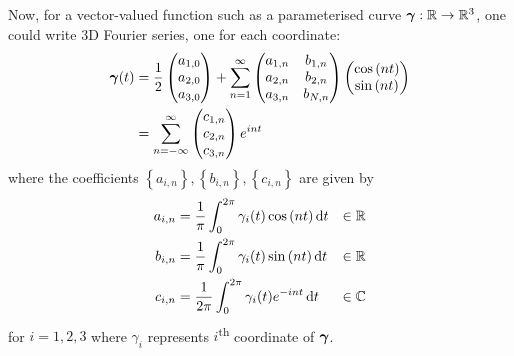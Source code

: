 \documentclass[../dissertation.tex]{subfiles}
\begin{document}
Now, for a vector-valued function such as a parameterised curve $\boldsymbol{\gamma}:\mathbb{R} \rightarrow \mathbb{R}^3$, one could write 3D Fourier series,
one for each coordinate:
\begin{align}
    \mathbf{\boldsymbol{\gamma}} (t) &= \frac{1}{2}
    \begin{pmatrix}
        a_{1,0} \\
        a_{2,0} \\
        a_{3,0}
    \end{pmatrix}
    + \sum_{n=1}^\infty
    \begin{pmatrix}
        a_{1,n} & b_{1,n} \\
        a_{2,n} & b_{2,n} \\
        a_{3,n} & b_{N,n}
    \end{pmatrix}
    \begin{pmatrix}
        \cos {\left( nt \right)} \\
        \sin {\left( nt \right)}
    \end{pmatrix}
    \\
    &= \sum_{n=-\infty}^{\infty}
    \begin{pmatrix}
        c_{1,n} \\
        c_{2,n} \\
        c_{3,n}
    \end{pmatrix}
    e^{int}
\end{align}
where the coefficients $\left\{ a_{i,n} \right\}, \left\{ b_{i,n} \right\}, \left\{ c_{i,n} \right\}$ are given by
\begin{align}
    a_{i,n} &= \frac{1}{\pi} \int_{0}^{2\pi} \gamma_i (t) \cos {\left( nt \right)} \, \text{d} t & \in \mathbb{R}\\
    b_{i,n} &= \frac{1}{\pi} \int_{0}^{2\pi} \gamma_i (t) \sin {\left( nt \right)} \, \text{d} t & \in \mathbb{R}\\
    c_{i,n} &= \frac{1}{2\pi} \int_{0}^{2\pi} \gamma_i (t) e^{-int} \, \text{d} t & \in \mathbb{C}
\end{align}
for $i=1, 2, 3$ where $\gamma_i$ represents $i$\textsuperscript{th} coordinate of $\boldsymbol{\gamma}$.
\end{document}
